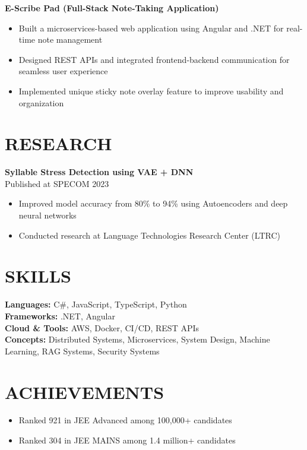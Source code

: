 \documentclass[letterpaper,11pt]{article}
\begin{document}
\textbf{E-Scribe Pad (Full-Stack Note-Taking Application)}
\begin{itemize}
    \item Built a microservices-based web application using Angular and .NET for real-time note management
    \item Designed REST APIs and integrated frontend-backend communication for seamless user experience
    \item Implemented unique sticky note overlay feature to improve usability and organization
\end{itemize}

\vspace{-6pt}

\section*{RESEARCH}

\textbf{Syllable Stress Detection using VAE + DNN} \\
Published at SPECOM 2023
\begin{itemize}
    \item Improved model accuracy from 80\% to 94\% using Autoencoders and deep neural networks
    \item Conducted research at Language Technologies Research Center (LTRC)
\end{itemize}

\vspace{-6pt}

\section*{SKILLS}

\textbf{Languages:} C\#, JavaScript, TypeScript, Python \\
\textbf{Frameworks:} .NET, Angular \\
\textbf{Cloud \& Tools:} AWS, Docker, CI/CD, REST APIs \\
\textbf{Concepts:} Distributed Systems, Microservices, System Design, Machine Learning, RAG Systems, Security Systems

\vspace{-6pt}

\section*{ACHIEVEMENTS}

\begin{itemize}
    \item Ranked 921 in JEE Advanced among 100,000+ candidates
    \item Ranked 304 in JEE MAINS among 1.4 million+ candidates

\end{itemize}
\end{document}
